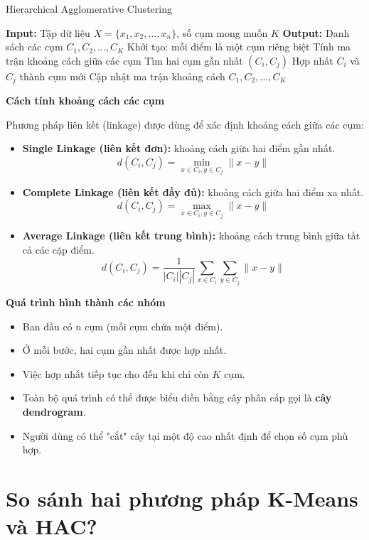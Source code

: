 \documentclass[12pt]{article}
\begin{document}
	\begin{algorithm}[H]
	\caption{Hierarchical Agglomerative Clustering}
	\begin{algorithmic}[1]
	\State \textbf{Input:} Tập dữ liệu $X = \{x_1, x_2, \dots, x_n\}$, số cụm mong muốn $K$
	\State \textbf{Output:} Danh sách các cụm $C_1, C_2, \dots, C_K$
	\State Khởi tạo: mỗi điểm là một cụm riêng biệt
	\State Tính ma trận khoảng cách giữa các cụm
	\State Tìm hai cụm gần nhất $(C_i, C_j)$
	\State Hợp nhất $C_i$ và $C_j$ thành cụm mới
	\State Cập nhật ma trận khoảng cách
	\EndWhile
	\State \Return $C_1, C_2, \dots, C_K$
	\end{algorithmic}
	\end{algorithm}
	
	\textbf{Cách tính khoảng cách các cụm}
	
	Phương pháp liên kết (linkage) được dùng để xác định khoảng cách giữa các cụm:
	
	\begin{itemize}
	\item \textbf{Single Linkage (liên kết đơn):} khoảng cách giữa hai điểm gần nhất.
	\[
	d(C_i, C_j) = \min_{x \in C_i, y \in C_j} \|x - y\|
	\]
	\item \textbf{Complete Linkage (liên kết đầy đủ):} khoảng cách giữa hai điểm xa nhất.
	\[
	d(C_i, C_j) = \max_{x \in C_i, y \in C_j} \|x - y\|
	\]
	\item \textbf{Average Linkage (liên kết trung bình):} khoảng cách trung bình giữa tất cả các cặp điểm.
	\[
	d(C_i, C_j) = \frac{1}{|C_i||C_j|} \sum_{x \in C_i} \sum_{y \in C_j} \|x - y\|
	\]
	\end{itemize}
	
	\textbf{Quá trình hình thành các nhóm}
	
	\begin{itemize}
	\item Ban đầu có $n$ cụm (mỗi cụm chứa một điểm).
	\item Ở mỗi bước, hai cụm gần nhất được hợp nhất.
	\item Việc hợp nhất tiếp tục cho đến khi chỉ còn $K$ cụm.
	\item Toàn bộ quá trình có thể được biểu diễn bằng cây phân cấp gọi là \textbf{cây dendrogram}.
	\item Người dùng có thể "cắt" cây tại một độ cao nhất định để chọn số cụm phù hợp.
	\end{itemize}
	
	\section{So sánh hai phương pháp K-Means và HAC?}
	
\end{document}
